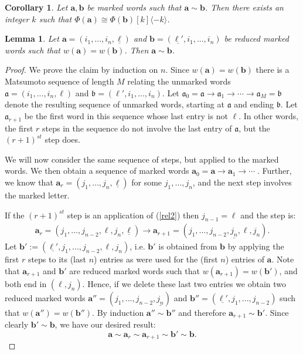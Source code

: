 \documentclass[11pt,reqno]{amsart}
\numberwithin{equation}{section}
\newtheorem{Lemma}[equation]{Lemma}
\newtheorem{Corollary}[equation]{Corollary}
\theoremstyle{definition}
\theoremstyle{named}
\newcommand{\ba}{\mathbf{a}}
\newcommand{\fa}{\mathfrak{a}}
\newcommand{\bb}{\mathbf{b}}
\newcommand{\fb}{\mathfrak{b}}
\newcommand{\ul}[1]{\underline{#1}}
\begin{document}
\begin{Corollary}\label{lem:markwrds1}
Let $\ba,\bb$ be marked words such that $\ba \sim \bb$.  Then there exists an integer $k$ such that $\Phi(\ba) \cong \Phi(\bb)[k]\langle -k \rangle$.
\end{Corollary}

\begin{Lemma}\label{lem:markwrds2}
Let $\ba=(i_1,...,i_n,\ul{\ell})$ and $\bb=(\ul{\ell'},i_1,...,i_n)$ be reduced marked words such that $w(\ba)=w(\bb)$.  Then $\ba \sim \bb$.  
\end{Lemma}

\begin{proof}
We prove the claim by induction on $n$.  Since $w(\ba)=w(\bb)$ there is a Matsumoto sequence of length $M$ relating the unmarked words  $\fa=(i_1,...,i_n,\ell)$ and $\fb=(\ell',i_1,...,i_n)$.  Let $\fa_0=\fa \to \fa_1 \to\cdots\to \fa_M=\fb$ denote the 
resulting sequence of unmarked words, starting at $\fa$ and ending $\fb$.  Let $\fa_{r+1}$ be the first word in this sequence whose last entry is not $\ell$.  In other words, the first $r$ steps in the sequence do not involve the last entry of $\fa$, but the $(r+1)^{st}$ step does.  

We will now consider  the same sequence of steps, but applied to the marked words.  We then obtain a sequence of marked words $\ba_0=\ba \to \ba_1 \to \cdots\;$.  Further, we know that $\ba_r=(j_1,\dots,j_n,\ul{\ell})$ for some $j_1,\hdots,j_n$, and the next step involves the marked letter.  

If the $(r+1)^{st}$ step is an application of (\ref{rel2}) then $j_{n-1}=\ell$ and the step is:
\begin{align*}
\ba_r=(j_1,\hdots,j_{n-2},\ell,j_n,\ul{\ell}) \to \ba_{r+1}=(j_1,\hdots,j_{n-2},\ul{j_n},\ell,j_n).
\end{align*}
Let $\bb':=(\ul{\ell'},j_1,...,j_{n-2},\ell,j_n)$, i.e. $\bb'$ is obtained from $\bb$ by applying the first $r$ steps to its (last $n$) entries as were used for the (first $n$) entries of $\ba$. Note that $\ba_{r+1}$ and $\bb'$ are reduced marked words such that $w(\ba_{r+1})=w(\bb')$, and both end in $(\ell,j_n)$.    Hence, if we delete these last two entries we obtain two reduced marked words $\ba''=(j_1,...,j_{n-2},\ul{j_n})$ and $\bb''=(\ul{\ell'},j_1,...,j_{n-2})$ such that $w(\ba'')=w(\bb'')$.  
By induction $\ba'' \sim \bb''$ and therefore $\ba_{r+1} \sim \bb'$.  Since clearly $\bb' \sim \bb$, we have our desired result:
$$
\ba \sim \ba_r \sim \ba_{r+1} \sim \bb' \sim \bb.
$$


\end{proof}
\end{document}
